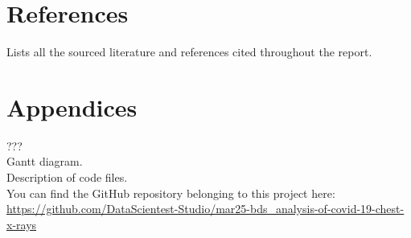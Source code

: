 \documentclass{article}
\begin{document}
\section{References}

Lists all the sourced literature and references cited throughout the report.

\section{Appendices}

??? \\
Gantt diagram. \\
Description of code files. \\
You can find the GitHub repository belonging to this project here: 
\url{https://github.com/DataScientest-Studio/mar25-bds_analysis-of-covid-19-chest-x-rays} 
\end{document}
